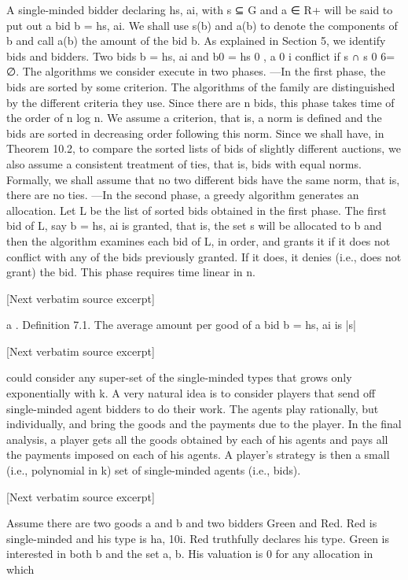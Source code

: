 \documentclass[10pt]{article}
\begin{document}
\begin{ReviewVerbatim}
A single-minded bidder declaring hs, ai, with s ⊆ G and a ∈ R+ will be said to
put out a bid b = hs, ai. We shall use s(b) and a(b) to denote the components of b
and call a(b) the amount of the bid b. As explained in Section 5, we identify bids
and bidders. Two bids b = hs, ai and b0 = hs 0 , a 0 i conflict if s ∩ s 0 6= ∅.
The algorithms we consider execute in two phases.
—In the first phase, the bids are sorted by some criterion. The algorithms of the
family are distinguished by the different criteria they use. Since there are n bids,
this phase takes time of the order of n log n. We assume a criterion, that is, a norm
is defined and the bids are sorted in decreasing order following this norm. Since
we shall have, in Theorem 10.2, to compare the sorted lists of bids of slightly
different auctions, we also assume a consistent treatment of ties, that is, bids
with equal norms. Formally, we shall assume that no two different bids have the
same norm, that is, there are no ties.
—In the second phase, a greedy algorithm generates an allocation. Let L be the
list of sorted bids obtained in the first phase. The first bid of L, say b = hs, ai is
granted, that is, the set s will be allocated to b and then the algorithm examines
each bid of L, in order, and grants it if it does not conflict with any of the bids
previously granted. If it does, it denies (i.e., does not grant) the bid. This phase
requires time linear in n.

[Next verbatim source excerpt]

a
.
Definition 7.1. The average amount per good of a bid b = hs, ai is |s|

[Next verbatim source excerpt]

could consider any super-set of the single-minded types that grows only exponentially with k. A very natural idea is to consider players that send off single-minded
agent bidders to do their work. The agents play rationally, but individually, and
bring the goods and the payments due to the player. In the final analysis, a player
gets all the goods obtained by each of his agents and pays all the payments imposed
on each of his agents. A player’s strategy is then a small (i.e., polynomial in k) set
of single-minded agents (i.e., bids).

[Next verbatim source excerpt]

Assume there are two goods a and b and two bidders Green and Red. Red is
single-minded and his type is h{a}, 10i. Red truthfully declares his type. Green is
interested in both b and the set {a, b}. His valuation is 0 for any allocation in which



\end{ReviewVerbatim}
\end{document}
